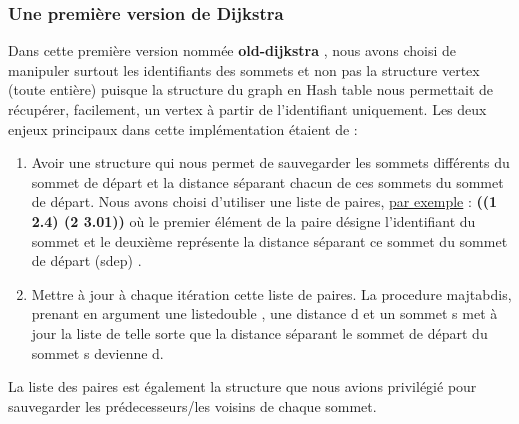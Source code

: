 \documentclass[french]{article}
\begin{document}
\subsubsection{Une première version de Dijkstra}
Dans cette première version nommée \textbf{old-dijkstra} , nous avons choisi de manipuler surtout les identifiants des sommets et non pas la structure vertex (toute entière) puisque la structure du graph en Hash table nous permettait de récupérer, facilement, un vertex à partir de l'identifiant uniquement. Les deux enjeux principaux dans cette implémentation étaient de :

\begin{enumerate}

\item Avoir une structure qui nous permet de sauvegarder les sommets différents du sommet de départ et la distance séparant chacun de ces sommets du sommet de départ. Nous avons choisi d'utiliser une liste de paires, \underline{par exemple} : \textbf{((1 2.4) (2 3.01))} où le premier élément de la paire désigne l'identifiant du sommet et le deuxième représente la distance séparant ce sommet du sommet de départ (sdep) .

\item Mettre à jour à chaque itération cette liste de paires. La procedure majtabdis, prenant en argument une listedouble , une distance d et un sommet s met à jour la liste de telle sorte que la distance séparant le sommet de départ du sommet s devienne d.    
\end{enumerate}
La liste des paires est également la structure que nous avions privilégié pour sauvegarder les prédecesseurs/les voisins de chaque sommet. 
\end{document}

